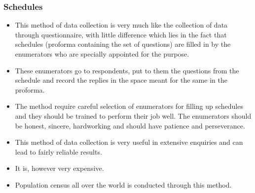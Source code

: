 \documentclass[
10pt, %
a4paper, %
]{report}
\begin{document}
\subsubsection*{Schedules}
\begin{itemize}
\item This method of data collection is very much like the collection of data through questionnaire, with little difference which lies in the fact that schedules (proforma containing the set of questions) are filled in by the enumerators who are specially appointed for the purpose.
\item These enumerators go to respondents, put to them the questions from the schedule and record the replies in the space meant for the same in the proforma.
\item The method require careful selection of enumerators for filling up schedules and they should be trained to perform their job well. The enumerators should be honest, sincere, hardworking and should have patience and perseverance.
\item This method of data collection is very useful in extensive enquiries and can lead to fairly reliable results.
\item It is, however very expensive.
\item Population census all over the world is conducted through this method.
\end{itemize}
\end{document}
